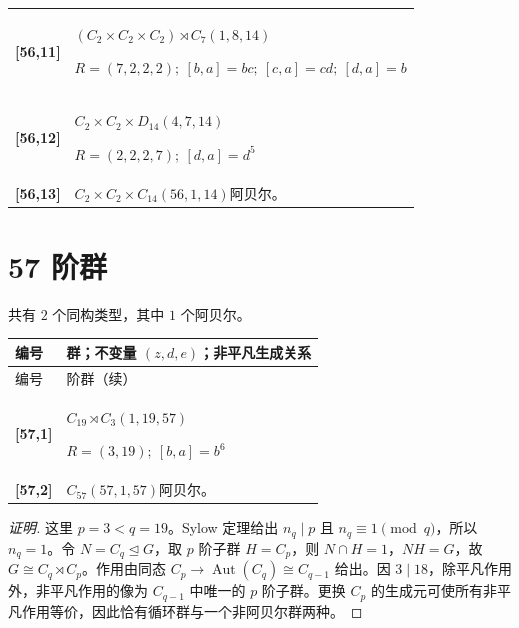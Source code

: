\documentclass[UTF8,fontset=fandol,11pt,a4paper]{ctexart}
\newcommand{\Aut}{\operatorname{Aut}}\newcommand{\GL}{\operatorname{GL}}\newcommand{\ord}{\operatorname{ord}}\newcommand{\Z}{\mathrm Z}
\begin{document}
\begin{longtable}{@{}p{17mm}>{\raggedright\arraybackslash}p{141mm}@{}}
\textbf{[56,11]} & $(C_{2}\times C_{2}\times C_{2})\rtimes C_{7}$\quad $(1,8,14)$\par\(R=(7,2,2,2);\allowbreak\ [b,a]=bc;\allowbreak\ [c,a]=cd;\allowbreak\ [d,a]=b\)\\[3pt]

\textbf{[56,12]} & $C_{2}\times C_{2}\times D_{14}$\quad $(4,7,14)$\par\(R=(2,2,2,7);\allowbreak\ [d,a]=d^{5}\)\\[3pt]

\textbf{[56,13]} & $C_{2}\times C_{2}\times C_{14}$\quad $(56,1,14)$\quad 阿贝尔。\\[3pt]

\end{longtable}\endgroup

\section*{57 阶群}\label{order:57}

共有 $2$ 个同构类型，其中 $1$ 个阿贝尔。

\begingroup\small\setlength{\tabcolsep}{3pt}\renewcommand{\arraystretch}{1.12}

\begin{longtable}{@{}p{17mm}>{\raggedright\arraybackslash}p{141mm}@{}}

\toprule 编号 & 群；不变量 $(z,d,e)$；非平凡生成关系\\\midrule\endfirsthead

\toprule 编号 & 57 阶群（续）\\\midrule\endhead\bottomrule\endfoot

\textbf{[57,1]} & $C_{19}\rtimes C_{3}$\quad $(1,19,57)$\par\(R=(3,19);\allowbreak\ [b,a]=b^{6}\)\\[3pt]

\textbf{[57,2]} & $C_{57}$\quad $(57,1,57)$\quad 阿贝尔。\\[3pt]

\end{longtable}\endgroup

\begin{proof}[证明]
这里 $p=3<q=19$。Sylow 定理给出 $n_q\mid p$ 且 $n_q\equiv1\pmod q$，所以 $n_q=1$。令 $N=C_q\trianglelefteq G$，取 $p$ 阶子群 $H=C_p$，则 $N\cap H=1$，$NH=G$，故 $G\cong C_q\rtimes C_p$。作用由同态 $C_p\to\Aut(C_q)\cong C_{q-1}$ 给出。因 $3\mid 18$，除平凡作用外，非平凡作用的像为 $C_{q-1}$ 中唯一的 $p$ 阶子群。更换 $C_p$ 的生成元可使所有非平凡作用等价，因此恰有循环群与一个非阿贝尔群两种。
\end{proof}
\end{document}
